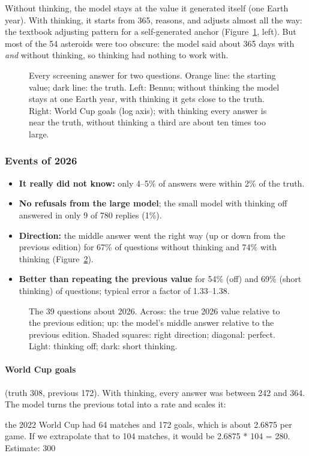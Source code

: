 \documentclass[11pt,a4paper]{article}
\begin{document}
Without thinking, the model stays at the value it generated itself (one Earth year). With thinking, it starts from 365, reasons, and adjusts almost all the way: the textbook adjusting pattern for a self-generated anchor (Figure~\ref{e4:fig:bennu}, left). But most of the 54 asteroids were too obscure: the model said about 365 days with \emph{and} without thinking, so thinking had nothing to work with.

\begin{figure}[ht]
\centering{}
\caption{Every screening answer for two questions. Orange line: the starting value; dark line: the truth. Left: Bennu; without thinking the model stays at one Earth year, with thinking it gets close to the truth. Right: World Cup goals (log axis); with thinking every answer is near the truth, without thinking a third are about ten times too large.}
\label{e4:fig:bennu}
\end{figure}

\subsubsection{Events of 2026}
\begin{itemize}[leftmargin=*]
  \item \textbf{It really did not know:} only 4--5\% of answers were within 2\% of the truth.
  \item \textbf{No refusals from the large model}; the small model with thinking off answered in only 9 of 780 replies (1\%).
  \item \textbf{Direction:} the middle answer went the right way (up or down from the previous edition) for 67\% of questions without thinking and 74\% with thinking (Figure~\ref{e4:fig:events}).
  \item \textbf{Better than repeating the previous value} for 54\% (off) and 69\% (short thinking) of questions; typical error a factor of 1.33--1.38.
\end{itemize}

\begin{figure}[ht]
\centering{}
\caption{The 39 questions about 2026. Across: the true 2026 value relative to the previous edition; up: the model's middle answer relative to the previous edition. Shaded squares: right direction; diagonal: perfect. Light: thinking off; dark: short thinking.}
\label{e4:fig:events}
\end{figure}

\paragraph{World Cup goals} (truth 308, previous 172). With thinking, every answer was between 242 and 364. The model turns the previous total into a rate and scales it:
\begin{transcript}
\cut{} the 2022 World Cup had 64 matches and 172 goals, which is about 2.6875 per game. If we extrapolate that to 104 matches, it would be 2.6875 * 104 = 280. \cut{} Estimate: 300
\end{transcript}
\end{document}
